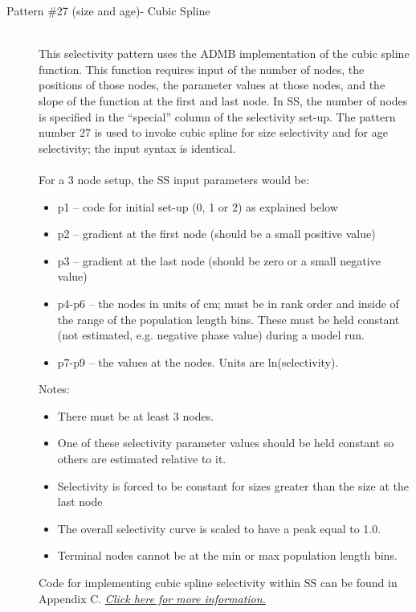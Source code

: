 \begin{description}
	\item[Pattern \#27 (size and age)- Cubic Spline]\hfil\\
	This selectivity pattern uses the ADMB implementation of the cubic spline function. This function requires input of the number of nodes, the positions of those nodes, the parameter values at those nodes, and the slope of the function at the first and last node.  In SS, the number of nodes is specified in the “special” column of the selectivity set-up.  The pattern number 27 is used to invoke cubic spline for size selectivity and for age selectivity; the input syntax is identical.\\
	\\
	For a 3 node setup, the SS input parameters would be:
	\begin{itemize}
		\item p1 – 	code for initial set-up (0, 1 or 2) as explained below
		\item p2 – 	gradient at the first node (should be a small positive value)
		\item p3 – 	gradient at the last node (should be zero or a small negative value)
		\item p4-p6 – the nodes in units of cm; must be in rank order and inside of the range of the population length bins.  These must be held constant (not estimated, e.g. negative phase value) during a model run.
		\item  p7-p9 – the values at the nodes.  Units are ln(selectivity).
	\end{itemize}
	Notes:
	\begin{itemize}
		\item There must be at least 3 nodes.
		\item One of these selectivity parameter values should be held constant so others are estimated relative to it.
		\item Selectivity is forced to be constant for sizes greater than the size at the last node
		\item The overall selectivity curve is scaled to have a peak equal to 1.0.
		\item Terminal nodes cannot be at the min or max population length bins.
	\end{itemize}
	
	Code for implementing cubic spline selectivity within SS can be found in Appendix C. \hyperlink{CubicSpline}{\textit{Click here for more information.}}\\


\end{description}
